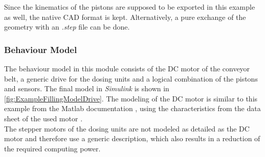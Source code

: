    Since the kinematics of the pistons are supposed to be exported in this example as well, the native CAD format is kept. Alternatively, a pure exchange of the geometry with an \textit{.step} file can be done.
    
\subsubsection{Behaviour Model}
    The behaviour model in this module consists of the DC motor of the conveyor belt, a generic drive for the dosing units and a logical combination of the pistons and sensors. The final model in \textit{Simulink} is shown in \autoref{fig:ExampleFillingModelDrive}. The modeling of the DC motor is similar to this example from the Matlab documentation \cite{SimulinkExampleDcMotorControl}, using the characteristics from the data sheet of the used motor \cite{DataSheetDCMotor}. \\
    The stepper motors of the dosing units are not modeled as detailed as the DC motor and therefore use a generic description, which also results in a reduction of the required computing power. \\
    

